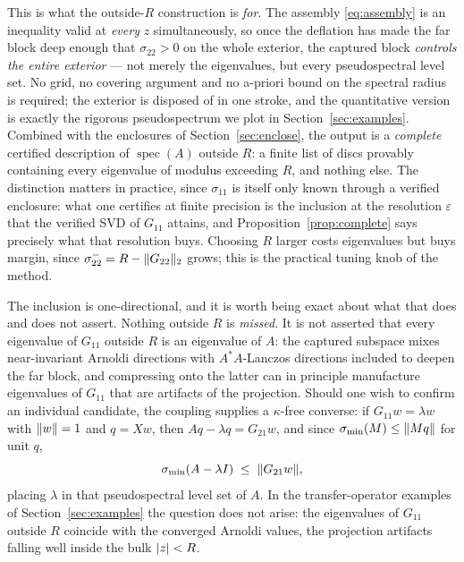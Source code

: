 \documentclass[11pt]{article}
\newcommand{\spec}{\operatorname{spec}}
\newcommand{\sig}{\sigma}
\newcommand{\sigmin}{\sigma_{\min}}
\DeclarePairedDelimiter{\norm}{\lVert}{\rVert}
\DeclarePairedDelimiter{\abs}{\lvert}{\rvert}
\begin{document}
This is what the outside-$R$ construction is \emph{for}. The assembly \eqref{eq:assembly} is an
inequality valid at \emph{every} $z$ simultaneously, so once the deflation has made the far block deep
enough that $\sig_{22}>0$ on the whole exterior, the captured block \emph{controls the entire exterior}
--- not merely the eigenvalues, but every pseudospectral level set. No grid, no covering argument and
no a-priori bound on the spectral radius is required; the exterior is disposed of in one stroke, and
the quantitative version is exactly the rigorous pseudospectrum we plot in
Section~\ref{sec:examples}. Combined with the enclosures of Section~\ref{sec:enclose}, the output is a
\emph{complete} certified description of $\spec(A)$ outside $R$: a finite list of discs provably
containing every eigenvalue of modulus exceeding $R$, and nothing else. The distinction matters in
practice, since $\sig_{11}$ is itself only known through a verified enclosure: what one certifies at
finite precision is the inclusion at the resolution $\varepsilon$ that the verified SVD of $G_{11}$
attains, and Proposition~\ref{prop:complete} says precisely what that resolution buys. Choosing $R$
larger costs eigenvalues but buys margin, since $\sig_{22}^-=R-\norm{G_{22}}_2$ grows; this is the
practical tuning knob of the method.

The inclusion is one-directional, and it is worth being exact about what that does and does not
assert. Nothing outside $R$ is \emph{missed}. It is not asserted that every eigenvalue of $G_{11}$
outside $R$ is an eigenvalue of $A$: the captured subspace mixes near-invariant Arnoldi directions
with $A^*A$-Lanczos directions included to deepen the far block, and compressing onto the latter can
in principle manufacture eigenvalues of $G_{11}$ that are artifacts of the projection. Should one wish
to confirm an individual candidate, the coupling supplies a $\kappa$-free converse: if
$G_{11}w=\lambda w$ with $\norm{w}=1$ and $q=Xw$, then $Aq-\lambda q=G_{21}w$, and since
$\sigmin(M)\le\norm{Mq}$ for unit $q$,
\begin{equation}\label{eq:eta}
  \sigmin(A-\lambda I)\;\le\;\norm{G_{21}w},
\end{equation}
placing $\lambda$ in that pseudospectral level set of $A$. In the transfer-operator examples of
Section~\ref{sec:examples} the question does not arise: the eigenvalues of $G_{11}$ outside $R$
coincide with the converged Arnoldi values, the projection artifacts falling well inside the bulk
$\abs{z}<R$.
\end{document}
